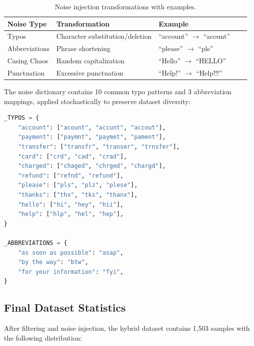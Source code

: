 \documentclass[12pt,a4paper]{article}
\renewcommand{\arraystretch}{1.5}
\newcommand{\goldrowcolors}{%
    \rowcolors{2}{bgCard}{bgDark}%
}
\newcommand{\tableheader}[1]{\textcolor{accentGold}{\textbf{#1}}}
\newcommand{\tablehdrrow}{\rowcolor{accentCard}}
\begin{document}
\begin{table}[H]
\centering
\goldrowcolors
\renewcommand{\arraystretch}{1.5}
\begin{tabular}{@{}L{3.5cm} V L{5cm} V L{5cm}@{}}
\toprule
\tablehdrrow
\tableheader{Noise Type} & \tableheader{Transformation} & \tableheader{Example} \\
\midrule
Typos & Character substitution/deletion & ``account'' $\rightarrow$ ``acount'' \\
Abbreviations & Phrase shortening & ``please'' $\rightarrow$ ``pls'' \\
Casing Chaos & Random capitalization & ``Hello'' $\rightarrow$ ``HELLO'' \\
Punctuation & Excessive punctuation & ``Help!'' $\rightarrow$ ``Help!!!'' \\
\bottomrule
\end{tabular}
\caption{Noise injection transformations with examples.}
\label{tab:noise}
\end{table}

The noise dictionary contains 10 common typo patterns and 3 abbreviation mappings, applied stochastically to preserve dataset diversity:

\begin{lstlisting}[language=Python, caption={Noise injection implementation from \texttt{build\_hybrid\_dataset.py}}]
_TYPOS = {
    "account": ["acount", "accunt", "accout"],
    "payment": ["paymnt", "paymet", "pament"],
    "transfer": ["transfr", "transer", "trnsfer"],
    "card": ["crd", "cad", "crad"],
    "charged": ["chaged", "chrged", "chargd"],
    "refund": ["refnd", "refund"],
    "please": ["pls", "plz", "plese"],
    "thanks": ["thx", "tks", "thanx"],
    "hello": ["hi", "hey", "hii"],
    "help": ["hlp", "hel", "hep"],
}

_ABBREVIATIONS = {
    "as soon as possible": "asap",
    "by the way": "btw",
    "for your information": "fyi",
}
\end{lstlisting}

\subsection{Final Dataset Statistics}
\label{subsec:dataset-stats}

After filtering and noise injection, the hybrid dataset contains 1,503 samples with the following distribution:
\end{document}
